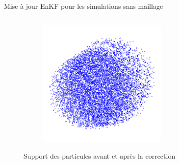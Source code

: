\documentclass[aspectratio=169]{beamer} %
\begin{document}
\begin{frame}{Mise à jour EnKF pour les simulations sans maillage}
\begin{columns}[t]
\begin{column}{0.3\textwidth}
\begin{figure}
\begin{subfigure}{\textwidth}
                \end{subfigure}
                \begin{subfigure}{\textwidth}
                    \centering
                    \includegraphics[width=0.7\textwidth]{../../conference/images/all_particles.pdf}
                \end{subfigure}
                \caption*{Support des particules avant et après la correction}
            \end{figure}
        \end{column}
    \end{columns}
\end{frame}

\end{document}
